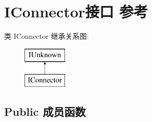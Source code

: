 \hypertarget{interface_i_connector}{}\section{I\+Connector接口 参考}
\label{interface_i_connector}
类 I\+Connector 继承关系图\+:\begin{figure}[H]
\begin{center}
\leavevmode
\includegraphics[height=2.000000cm]{interface_i_connector}
\end{center}
\end{figure}
\subsection*{Public 成员函数}

